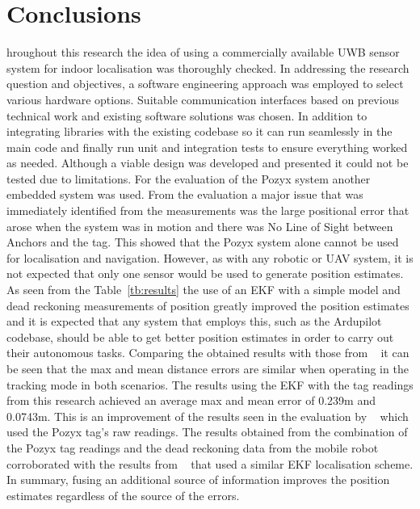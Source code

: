 \section{Conclusions}\label{sec:conclusions}
hroughout this research the idea of using a commercially available UWB sensor system for indoor localisation was thoroughly checked.
In addressing the research question and objectives, a software engineering approach was employed to select various hardware options.
Suitable communication interfaces based on previous technical work and existing software solutions was chosen.
In addition to integrating libraries with the existing codebase so it can run seamlessly in the main code and finally run unit and integration tests to ensure everything worked as needed.
Although a viable design was developed and presented it could not be tested due to limitations.
For the evaluation of the Pozyx system another embedded system was used.
From the evaluation a major issue that was immediately identified from the measurements was the large positional error that arose when the system was in motion and there was No Line of Sight between Anchors and the tag.
This showed that the Pozyx system alone cannot be used for localisation and navigation.
However, as with any robotic or UAV system, it is not expected that only one sensor would be used to generate position estimates.
As seen from the Table~\ref{tb:results} the use of an EKF with a simple model and dead reckoning measurements of position greatly improved the position estimates and it is expected that any system that employs this, such as the Ardupilot codebase, should be able to get better position estimates in order to carry out
their autonomous tasks.
Comparing the obtained results with those from ~\citet{di2019evaluation} it can be seen that the max and mean distance errors are similar when operating in the tracking mode in both scenarios.
The results using the EKF with the tag readings from this research achieved an average max and mean error of 0.239m and 0.0743m.
This is an improvement of the results seen in the evaluation by ~\citet{di2019evaluation} which used the Pozyx tag's raw readings.
The results obtained from the combination of the Pozyx tag readings and the dead reckoning data from the mobile robot corroborated with the results from ~\citet{conceiccao2017robot} that used a similar EKF localisation scheme.
In summary, fusing an additional source of information improves the position estimates regardless of the source of the errors.

